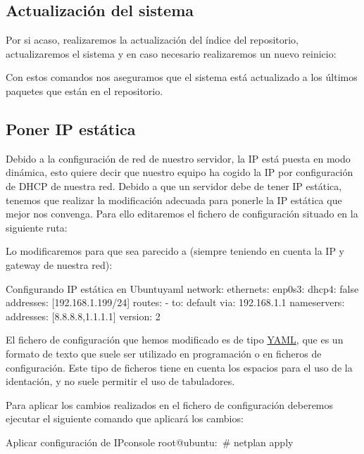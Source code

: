 \subsection{Actualización del sistema}
Por si acaso, realizaremos la actualización del índice del repositorio, actualizaremos el sistema y en caso necesario realizaremos un nuevo reinicio:


Con estos comandos nos aseguramos que el sistema está actualizado a los últimos paquetes que están en el repositorio.


\hypertarget{configurar_ip_estatica_ubuntu}{}
\subsection{Poner IP estática}
Debido a la configuración de red de nuestro servidor, la IP está puesta en modo dinámica, esto quiere decir que nuestro equipo ha cogido la IP por configuración de DHCP de nuestra red. Debido a que un servidor debe de tener IP estática, tenemos que realizar la modificación adecuada para ponerle la IP estática que mejor nos convenga. Para ello editaremos el fichero de configuración situado en la siguiente ruta: 

Lo modificaremos para que sea parecido a (siempre teniendo en cuenta la IP y gateway de nuestra red):


\begin{mycode}{Configurando IP estática en Ubuntu}{yaml}{}
network:
  ethernets:
    enp0s3:
      dhcp4: false
      addresses: [192.168.1.199/24]
      routes:
      - to: default
        via: 192.168.1.1
      nameservers:
        addresses: [8.8.8.8,1.1.1.1]
  version: 2
\end{mycode}

El fichero de configuración que hemos modificado es de tipo \href{https://es.wikipedia.org/wiki/YAML}{YAML}, que es un formato de texto que suele ser utilizado en programación o en ficheros de configuración. Este tipo de ficheros tiene en cuenta los espacios para el uso de la identación, y no suele permitir el uso de tabuladores.

Para aplicar los cambios realizados en el fichero de configuración deberemos ejecutar el siguiente comando que aplicará los cambios:

\begin{mycode}{Aplicar configuración de IP}{console}{}
root@ubuntu:~# netplan apply
\end{mycode}

\clearpage